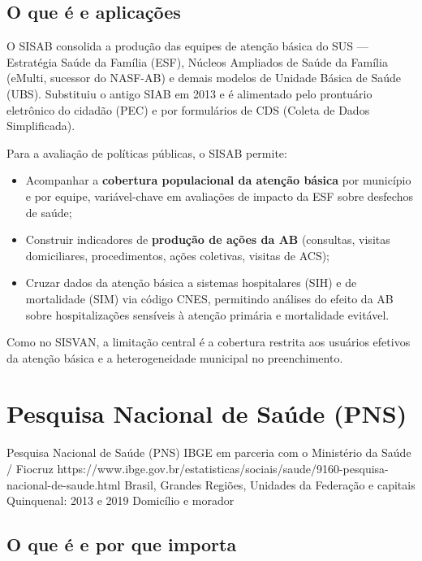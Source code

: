 \subsection{O que é e aplicações}

O SISAB consolida a produção das equipes de atenção básica do SUS --- Estratégia Saúde da Família (ESF), Núcleos Ampliados de Saúde da Família (eMulti, sucessor do NASF-AB) e demais modelos de Unidade Básica de Saúde (UBS). Substituiu o antigo SIAB em 2013 e é alimentado pelo prontuário eletrônico do cidadão (PEC) e por formulários de CDS (Coleta de Dados Simplificada).

Para a avaliação de políticas públicas, o SISAB permite:
\begin{itemize}
  \item Acompanhar a \textbf{cobertura populacional da atenção básica} por município e por equipe, variável-chave em avaliações de impacto da ESF sobre desfechos de saúde;
  \item Construir indicadores de \textbf{produção de ações da AB} (consultas, visitas domiciliares, procedimentos, ações coletivas, visitas de ACS);
  \item Cruzar dados da atenção básica a sistemas hospitalares (SIH) e de mortalidade (SIM) via código CNES, permitindo análises do efeito da AB sobre hospitalizações sensíveis à atenção primária e mortalidade evitável.
\end{itemize}

Como no SISVAN, a limitação central é a cobertura restrita aos usuários efetivos da atenção básica e a heterogeneidade municipal no preenchimento.

\section{Pesquisa Nacional de Saúde (PNS)}

\ficharapida
  {Pesquisa Nacional de Saúde (PNS)}
  {IBGE em parceria com o Ministério da Saúde / Fiocruz}
  {https://www.ibge.gov.br/estatisticas/sociais/saude/9160-pesquisa-nacional-de-saude.html}
  {Brasil, Grandes Regiões, Unidades da Federação e capitais}
  {Quinquenal: 2013 e 2019}
  {Domicílio e morador}

\subsection{O que é e por que importa}

